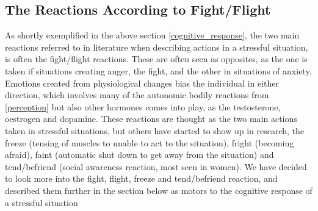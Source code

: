\subsection{The Reactions According to Fight/Flight}
As shortly exemplified in the above section \ref{cognitive_response}, the two main reactions referred to in literature when describing actions in a stressful situation, is often the fight/flight reactions. These are often seen as opposites, as the one is taken if situations creating anger, the fight, and the other in situations of anxiety. Emotions created from physiological changes bias the individual in either direction, which involves many of the autonomic bodily reactions from \ref{perception} but also other hormones comes into play, as the testosterone, oestrogen and dopamine. These reactions are thought as the two main actions taken in stressful situations, but others have started to show up in research, the freeze (tensing of muscles to unable to act to the situation), fright (becoming afraid), faint (automatic shut down to get away from the situation) and tend/befriend (social awareness reaction, most seen in women). We have decided to look more into the fight, flight, freeze and tend/befriend reaction, and described them further in the section below as motors to the cognitive response of a stressful situation 
\cite{fightflight} \cite{5responses} \cite{tendbefriend}

